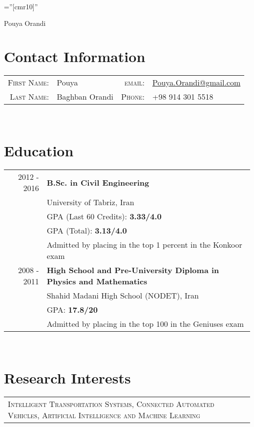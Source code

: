 \documentclass[a4paper,10pt]{article}
\begin{document}
\pagestyle{empty} %
\font\fb=''[cmr10]'' %

\par{
    \centering
    \Huge Pouya Orandi
    \bigskip\par}

\section{Contact Information}
\begin{tabular}{r p{5.75cm} r l}
    \textsc{First Name:} & Pouya & \textsc{email:} & \href{mailto:Pouya.Orandi@gmail.com}{Pouya.Orandi@gmail.com}\\ 
    \textsc{Last Name:} & Baghban Orandi & \textsc{Phone:} & +98 914 301 5518
\end{tabular}
\\

\section{Education}
\begin{tabular}{r|l}	
    \textsc{2012 - 2016} & \textbf{B.Sc. in Civil Engineering}\\
    & University of Tabriz, Iran\\
	& GPA (Last 60 Credits): \textbf{3.33/4.0} \\
    & GPA (Total): \textbf{3.13/4.0} \\
 	& \footnotesize{Admitted by placing in the top 1 percent in the Konkoor exam}
 	\multicolumn{2}{c}{}\\
 \textsc{2008 - 2011} & \textbf{High School and Pre-University Diploma in Physics and Mathematics}\\
    & Shahid Madani High School (NODET), Iran\\
    & GPA: \textbf{17.8/20}\\
    & \footnotesize{Admitted by placing in the top 100 in the Geniuses exam}
\end{tabular}
\\

\section{Research Interests}
\begin{tabular}{p{14cm}}
    \textsc{Intelligent Transportation Systems, Connected Automated Vehicles, Artificial Intelligence and Machine Learning}
\end{tabular}
\\
\end{document}
